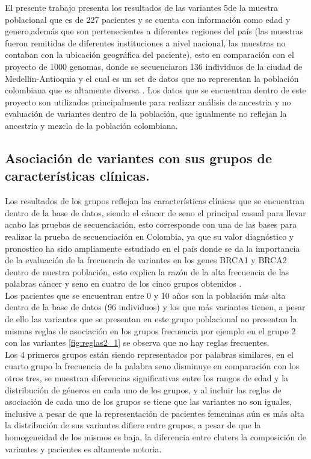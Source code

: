 El presente trabajo presenta los resultados de las variantes 5de la muestra poblacional que es de 227 pacientes y se cuenta con información como edad y genero,además que son pertenecientes a diferentes regiones del país (las muestras fueron remitidas de diferentes instituciones a nivel nacional, las muestras no contaban con la ubicación geográfica del paciente), esto en comparación con el proyecto de 1000 genomas, donde se secuenciaron 136 individuos de la ciudad de Medellín-Antioquia y el cual es un set de datos que no representan la población colombiana que es altamente diversa \cite{GabrielBedoya,Consortium2012}. Los datos que se encuentran dentro de este proyecto son utilizados principalmente para realizar análisis de ancestria \cite{Rishishwar2015a} y no evaluación de variantes dentro de la población, que igualmente no reflejan la ancestria y mezcla de la población colombiana. 

\subsection{Asociación de variantes con sus grupos de características clínicas.}

Los resultados de los grupos reflejan las características clínicas que se encuentran dentro de la base de datos, siendo el cáncer de seno el principal casual para llevar acabo las pruebas de secuenciación, esto corresponde con una de las bases para realizar la prueba de secuenciación en Colombia, ya que su valor diagnóstico y pronostico ha sido ampliamente estudiado en el país donde se da la importancia de la evaluación de la frecuencia de variantes en los genes BRCA1 y BRCA2 dentro de nuestra población, esto explica la razón de la alta frecuencia de las palabras cáncer y seno en cuatro de los cinco grupos obtenidos \cite{Ignacio2017,Arias-blanco2015}.\\

Los pacientes que se encuentran entre 0 y 10 años son la población más alta dentro de la base de datos (96 individuos)  y los que más variantes tienen, a pesar de ello las variantes que se presentan en este grupo poblacional no presentan la mismas reglas de asociación en los grupos frecuencia por ejemplo en el grupo 2 con las variantes \ref{fig:reglas2_1} se observa que no hay reglas frecuentes.\\ 

Los 4 primeros grupos están siendo representados por palabras similares, en el cuarto grupo la frecuencia de la palabra seno disminuye en comparación con los otros tres, se muestran diferencias significativas entre los rangos de edad y la distribución de géneros en cada uno de los grupos, y al incluir las reglas de asociación de cada uno de los grupos se tiene que las variantes no son iguales, inclusive a pesar de que la representación de pacientes femeninas aún es más alta la distribución de sus variantes difiere entre grupos, a pesar de que la homogeneidad de los mismos es baja, la diferencia entre cluters la composición de variantes y pacientes es altamente notoria.\\  

